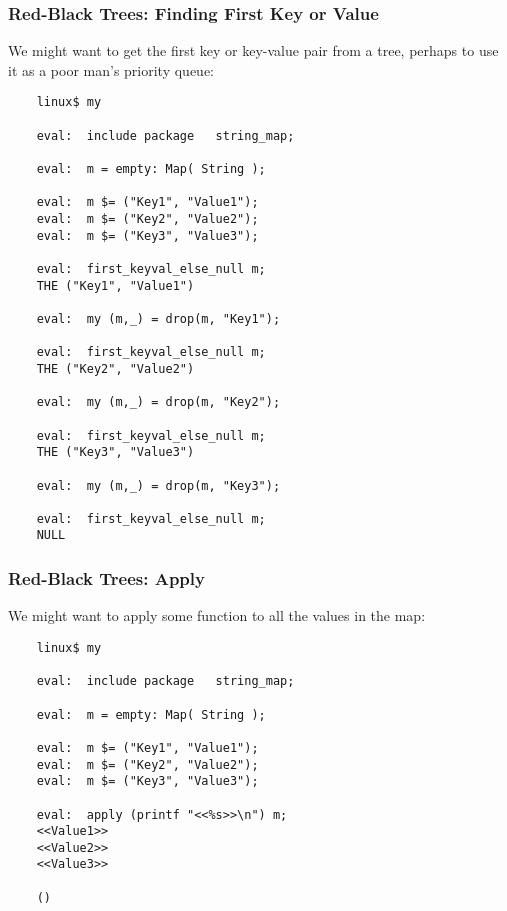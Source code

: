 \cutend*

\subsubsection{Red-Black Trees:  Finding First Key or Value}

We might want to get the first key or key-value pair from a tree, 
perhaps to use it as a poor man's priority queue:

\begin{verbatim}
    linux$ my

    eval:  include package   string_map;

    eval:  m = empty: Map( String );

    eval:  m $= ("Key1", "Value1");
    eval:  m $= ("Key2", "Value2");
    eval:  m $= ("Key3", "Value3");

    eval:  first_keyval_else_null m;
    THE ("Key1", "Value1")

    eval:  my (m,_) = drop(m, "Key1");

    eval:  first_keyval_else_null m;
    THE ("Key2", "Value2")

    eval:  my (m,_) = drop(m, "Key2");

    eval:  first_keyval_else_null m;
    THE ("Key3", "Value3")

    eval:  my (m,_) = drop(m, "Key3");

    eval:  first_keyval_else_null m;
    NULL
\end{verbatim}


\cutend*

\subsubsection{Red-Black Trees:  Apply}

We might want to apply some function to all the values in the map:

\begin{verbatim}
    linux$ my

    eval:  include package   string_map;

    eval:  m = empty: Map( String );

    eval:  m $= ("Key1", "Value1");
    eval:  m $= ("Key2", "Value2");
    eval:  m $= ("Key3", "Value3");

    eval:  apply (printf "<<%s>>\n") m;
    <<Value1>>
    <<Value2>>
    <<Value3>>

    ()
\end{verbatim}


